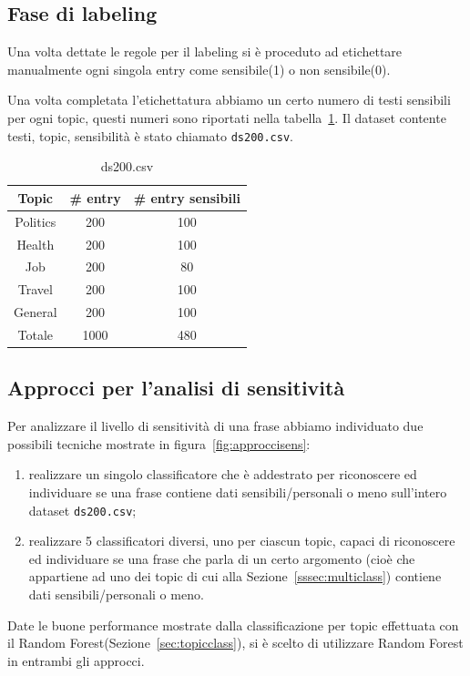 \subsection{Fase di labeling}
\label{ssec: lbl_sens}
Una volta dettate le regole per il labeling si è proceduto ad etichettare manualmente ogni singola entry come sensibile(1) o non sensibile(0).

Una volta completata l'etichettatura abbiamo un certo numero di testi sensibili per ogni topic, questi numeri sono riportati nella tabella~\ref{tbl:ds200}. Il dataset contente testi, topic, sensibilità è stato chiamato  {\tt{ds200.csv}}.

\begin{table}[h]
\centering
\begin{tabular}{|c|c|c|}
\hline
\textbf{Topic} & \textbf{\# entry} & \textbf{\# entry sensibili} \\ \hline
Politics & 200 & 100 \\ \hline
Health & 200 & 100 \\ \hline
Job & 200 & 80 \\ \hline
Travel & 200 & 100 \\ \hline
General & 200 & 100 \\ \hline
Totale & 1000 & 480 \\ \hline
\end{tabular}
\caption{ds200.csv}
\label{tbl:ds200}
\end{table}
\FloatBarrier

\subsection{Approcci per l'analisi di sensitività}
\label{ssec:approcci}
Per analizzare il livello di sensitività di una frase abbiamo individuato due possibili tecniche mostrate in figura~\ref{fig:approccisens}:
\begin{enumerate}
    \item realizzare un singolo classificatore che è addestrato per riconoscere ed individuare se una frase contiene dati sensibili/personali o meno sull'intero dataset {\tt ds200.csv};
    \item realizzare 5 classificatori diversi, uno per ciascun topic, capaci di riconoscere ed individuare se una frase che parla di un certo argomento (cioè che appartiene ad uno dei topic di cui alla Sezione~\ref{sssec:multiclass}) contiene dati sensibili/personali o meno.
\end{enumerate}
Date le buone performance mostrate dalla classificazione per topic effettuata con il Random Forest(Sezione~\ref{sec:topicclass}), si è scelto di utilizzare Random Forest in entrambi gli approcci.

